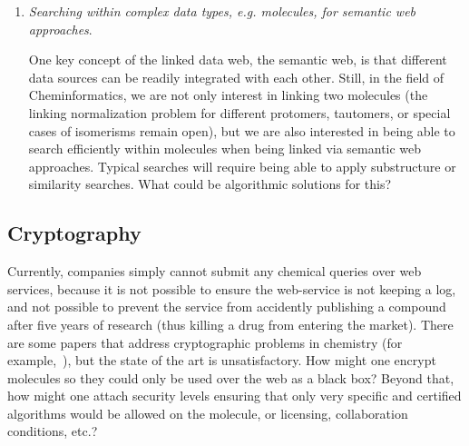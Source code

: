 \documentclass{sig-alternate}
\begin{document}
\begin{enumerate}
\item \emph{Searching within complex data types, e.g. molecules, for semantic web approaches}.

  One key concept of the linked data web, the semantic web, is that
  different data sources can be readily integrated with each
  other. Still, in the field of Cheminformatics, we are not only
  interest in linking two molecules (the linking normalization problem
  for different protomers, tautomers, or special cases of isomerisms
  remain open), but we are also interested in being able to search
  efficiently within molecules when being linked via semantic web
  approaches. Typical searches will require being able to apply
  substructure or similarity searches.  What could be algorithmic
  solutions for this?
\end{enumerate}

\subsection*{Cryptography}

Currently, companies simply cannot submit any chemical queries over web services, because it is not possible to ensure the web-service is not keeping a log, and not possible to prevent the service from accidently publishing a compound after five years of research (thus killing a drug from entering the market).  There are some papers that address cryptographic problems in chemistry (for example,~\cite{Digital_Watermarking_Chemicals}), but the state of the art is unsatisfactory.  How might one encrypt molecules so they could only be used over the web as a black box?  Beyond that, how might one attach security levels ensuring that only very specific and certified algorithms would be allowed on the molecule, or licensing, collaboration conditions, etc.?
\end{document}
